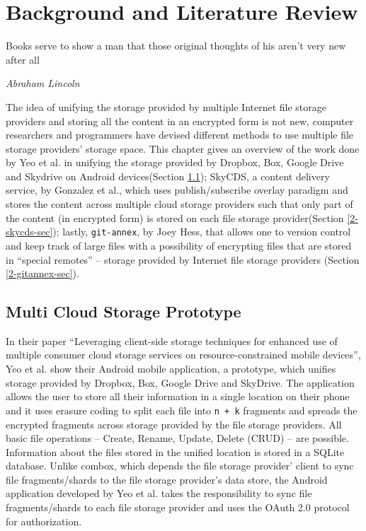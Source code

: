 \chapter{Background and Literature Review}

\epigraph{Books serve to show a man that those original thoughts of
  his aren't very new after all}{\textit{Abraham Lincoln}}

The idea of unifying the storage provided by multiple Internet file
storage providers and storing all the content in an encrypted form is
not new, computer researchers and programmers have devised different
methods to use multiple file storage providers' storage space. This
chapter gives an overview of the work done by Yeo et al. in unifying
the storage provided by Dropbox, Box, Google Drive and Skydrive on
Android devices\cite{yeo}(Section \ref{2-yeo-sec}); SkyCDS, a content
delivery service, by Gonzalez et al., which uses publish/subscribe
overlay paradigm and stores the content across multiple cloud storage
providers such that only part of the content (in encrypted form) is
stored on each file storage provider\cite{skycds}(Section
\ref{2-skycds-sec}); lastly, \verb+git-annex+, by Joey
Hess\cite{person:joeyh}, that allows one to version control and keep
track of large files with a possibility of encrypting files that are
stored in ``special remotes'' -- storage provided by Internet file
storage providers (Section \ref{2-gitannex-sec}).

\section{Multi Cloud Storage Prototype}\label{2-yeo-sec}

In their paper ``Leveraging client-side storage techniques for
enhanced use of multiple consumer cloud storage services on
resource-constrained mobile devices'', Yeo et al. show their Android
mobile application, a prototype, which unifies storage provided by
Dropbox, Box, Google Drive and SkyDrive. The application allows the
user to store all their information in a single location on their
phone and it uses erasure coding\cite{weatherspoon} to split each file
into \verb`n + k` fragments and spreads the encrypted fragments across
storage provided by the file storage providers. All basic file
operations -- Create, Rename, Update, Delete (CRUD) -- are
possible. Information about the files stored in the unified location
is stored in a SQLite database. Unlike combox, which depends the file
storage provider' client to sync file fragments/shards to the file
storage provider's data store, the Android application developed by
Yeo et al. takes the responsibility to sync file fragments/shards to
each file storage provider and uses the OAuth
2.0\cite{protocol:oauth2} protocol for authorization.

